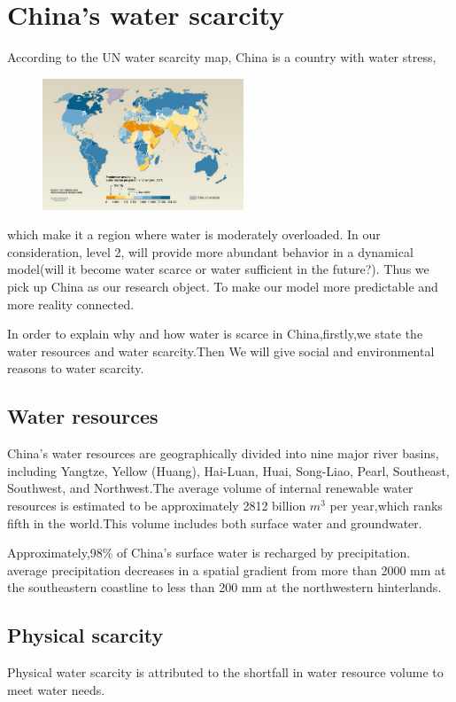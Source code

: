 \section{China's water scarcity}
  According to the UN water scarcity map\cite{WaterScarcityMap}, China is a country with water stress,
  \begin{figure}
  \includegraphics[width = 6cm]{picture/WaterScarcityMap.jpg}
  \end{figure}
  which make it a region where water is moderately overloaded. In our consideration, level 2, will provide more abundant behavior in a dynamical model(will it become water scarce or water sufficient in the future?). Thus we pick up China as our research object. To make our model more predictable and more reality connected.

  In order to explain why and how water is scarce in China,firstly,we state the water resources and water scarcity.Then We will give social and environmental reasons to water scarcity.

\subsection{Water resources}
China’s water resources are geographically divided into nine major river basins, including Yangtze, Yellow (Huang), Hai-Luan, Huai, Song-Liao, Pearl, Southeast, Southwest, and Northwest.The average volume of internal renewable water resources is estimated to be approximately 2812 billion $m^3$ per year,which ranks fifth in the world.\cite{Review}This volume includes both surface water and groundwater.

Approximately,98\% of China's surface water is recharged by precipitation.\cite{MWR2004a} average precipitation decreases in a spatial gradient from more than 2000 mm at the southeastern coastline to less than 200 mm at the northwestern hinterlands.\cite{MWR2004a}

\subsection{Physical scarcity}
Physical water scarcity is attributed to the shortfall in water resource volume to meet water needs.

